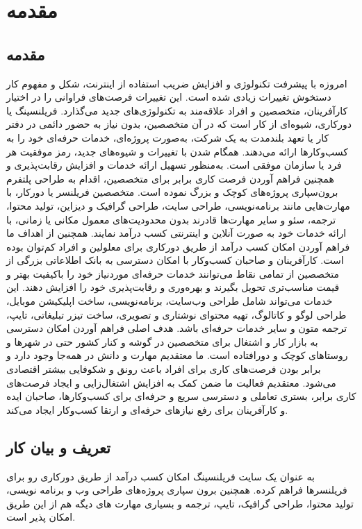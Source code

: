 \chapter{مقدمه}
\clearpage

\section*{مقدمه}
امروزه با پیشرفت تکنولوژی و افزایش ضریب استفاده از اینترنت، شکل و مفهوم کار دستخوش تغییرات زیادی شده است. این تغییرات فرصت‌های فراوانی را در اختیار کارآفرینان، متخصصین و افراد علاقه‌مند به تکنولوژی‌های جدید می‌گذارد.
فریلنسینگ یا دورکاری، شیوه‌ای از کار است که در آن متخصصین، بدون نیاز به حضور دائمی در دفتر کار یا تعهد بلندمدت به یک شرکت، به‌صورت پروژه‌ای، خدمات حرفه‌ای خود را به کسب‌وکارها ارائه می‌دهند. همگام شدن با تغییرات و شیوه‌های جدید، رمز موفقیت هر فرد یا سازمان موفقی است. به‌منظور تسهیل ارائه خدمات و افزایش رقابت‌پذیری و همچنین فراهم آوردن فرصت کاری برابر برای متخصصین، اقدام به طراحی پلتفرم برون‌سپاری پروژه‌های کوچک و بزرگ نموده است.
 متخصصین فریلنسر یا دورکار، با مهارت‌هایی مانند برنامه‌نویسی، طراحی سایت، طراحی گرافیک و دیزاین، تولید محتوا، ترجمه، سئو و سایر مهارت‌ها قادرند بدون محدودیت‌های معمول مکانی یا زمانی، با ارائه خدمات خود به صورت آنلاین و اینترنتی کسب درآمد نمایند. همچنین از اهداف ما فراهم آوردن امکان کسب درآمد از طریق دورکاری برای معلولین و افراد کم‌توان بوده است. کارآفرینان و صاحبان کسب‌وکار با امکان دسترسی به بانک اطلاعاتی بزرگی از متخصصین از تمامی نقاط می‌توانند خدمات حرفه‌ای موردنیاز خود را باکیفیت بهتر و قیمت مناسب‌تری تحویل بگیرند و بهره‌وری و رقابت‌پذیری خود را افزایش دهند. این خدمات می‌تواند شامل طراحی وب‌سایت، برنامه‌نویسی، ساخت اپلیکیشن موبایل، طراحی لوگو و کاتالوگ، تهیه محتوای نوشتاری و تصویری، ساخت تیزر تبلیغاتی، تایپ، ترجمه متون و سایر خدمات حرفه‌ای باشد.
هدف اصلی فراهم آوردن امکان دسترسی به بازار کار و اشتغال برای متخصصین در گوشه و کنار کشور حتی در شهرها و روستاهای کوچک و دورافتاده است. ما معتقدیم مهارت و دانش در همه‌جا وجود دارد و برابر بودن فرصت‌های کاری برای افراد باعث رونق و شکوفایی بیشتر اقتصادی می‌شود. معتقدیم فعالیت ما ضمن کمک به افزایش اشتغال‌زایی و ایجاد فرصت‌های کاری برابر، بستری تعاملی و دسترسی سریع و حرفه‌ای برای کسب‌وکارها، صاحبان ایده و کارآفرینان برای رفع نیازهای حرفه‌ای و ارتقا کسب‌وکار ایجاد می‌کند.
\section{تعریف و بیان کار}
 به عنوان یک سایت فریلنسینگ امکان کسب درآمد از طریق دورکاری رو برای فریلنسرها فراهم کرده. همچنین برون سپاری پروژه‌های طراحی وب و برنامه نویسی، تولید محتوا، طراحی گرافیک، تایپ، ترجمه و بسیاری مهارت های دیگه هم از این طریق امکان پذیر است.

